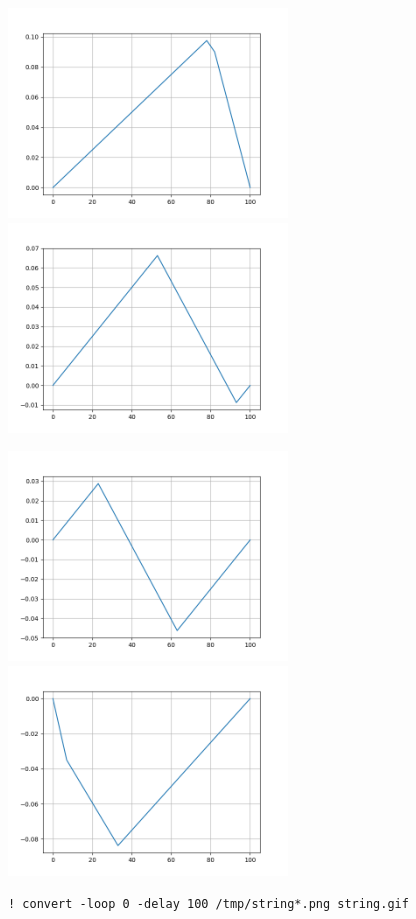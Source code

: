 \documentclass[12pt,fleqn]{article}\usepackage{../../common}
\begin{document}
\includegraphics[width=20em]{string-00.png}
\includegraphics[width=20em]{string-25.png}

\includegraphics[width=20em]{string-55.png}
\includegraphics[width=20em]{string-85.png}


\begin{verbatim}
! convert -loop 0 -delay 100 /tmp/string*.png string.gif
\end{verbatim}
\end{document}
